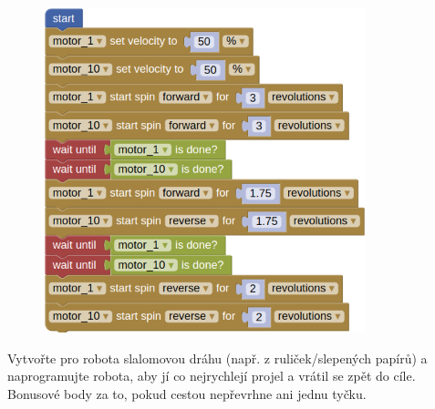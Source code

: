 \documentclass[../main.tex]{subfiles}
\begin{document}
	\begin{solution}%
		\begin{figure}
			\centering
			\begin{minipage}{0.5\textwidth}
				\includegraphics[width=\linewidth]{../Images/02/sol6.png}
			\end{minipage}
		\end{figure}
	\end{solution}

	\begin{question*}
		Vytvořte pro robota slalomovou dráhu (např. z ruliček/slepených papírů) a naprogramujte robota, aby jí co nejrychlejí projel a vrátil se zpět do cíle. Bonusové body za to, pokud cestou nepřevrhne ani jednu tyčku.
	\end{question*}
\end{document}
